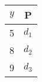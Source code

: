 \begin{tabular}{|c|c|}
\hline
 $y$ & P     \\ \hline
5 & $d_1$ \\ \hline
8 & $d_2$ \\ \hline
9 & $d_3$ \\ \hline
\end{tabular}

